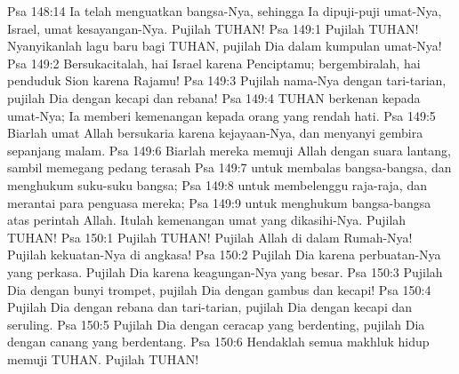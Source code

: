 Psa 148:14  Ia telah menguatkan bangsa-Nya, sehingga Ia dipuji-puji umat-Nya, Israel, umat kesayangan-Nya. Pujilah TUHAN!
Psa 149:1  Pujilah TUHAN! Nyanyikanlah lagu baru bagi TUHAN, pujilah Dia dalam kumpulan umat-Nya!
Psa 149:2  Bersukacitalah, hai Israel karena Penciptamu; bergembiralah, hai penduduk Sion karena Rajamu!
Psa 149:3  Pujilah nama-Nya dengan tari-tarian, pujilah Dia dengan kecapi dan rebana!
Psa 149:4  TUHAN berkenan kepada umat-Nya; Ia memberi kemenangan kepada orang yang rendah hati.
Psa 149:5  Biarlah umat Allah bersukaria karena kejayaan-Nya, dan menyanyi gembira sepanjang malam.
Psa 149:6  Biarlah mereka memuji Allah dengan suara lantang, sambil memegang pedang terasah
Psa 149:7  untuk membalas bangsa-bangsa, dan menghukum suku-suku bangsa;
Psa 149:8  untuk membelenggu raja-raja, dan merantai para penguasa mereka;
Psa 149:9  untuk menghukum bangsa-bangsa atas perintah Allah. Itulah kemenangan umat yang dikasihi-Nya. Pujilah TUHAN!
Psa 150:1  Pujilah TUHAN! Pujilah Allah di dalam Rumah-Nya! Pujilah kekuatan-Nya di angkasa!
Psa 150:2  Pujilah Dia karena perbuatan-Nya yang perkasa. Pujilah Dia karena keagungan-Nya yang besar.
Psa 150:3  Pujilah Dia dengan bunyi trompet, pujilah Dia dengan gambus dan kecapi!
Psa 150:4  Pujilah Dia dengan rebana dan tari-tarian, pujilah Dia dengan kecapi dan seruling.
Psa 150:5  Pujilah Dia dengan ceracap yang berdenting, pujilah Dia dengan canang yang berdentang.
Psa 150:6  Hendaklah semua makhluk hidup memuji TUHAN. Pujilah TUHAN!



